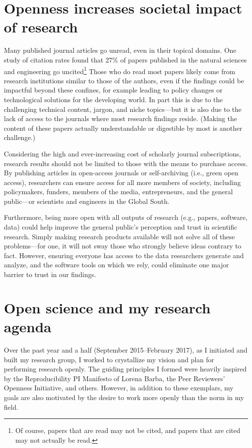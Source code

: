 \documentclass[nobib]{tufte-handout}
\begin{document}
\section{Openness increases societal impact of research}
\label{sec:impact}

Many published journal articles go unread, even in their topical domains.
One study of citation rates found that 27\% of papers published in the natural
sciences and engineering go uncited\autocite{Lariviere:2009}\footnote{Of course,
papers that are read may not be cited, and papers that are cited may not actually
be read.}
Those who do read most papers likely come from research institutions similar to
those of the authors, even if the findings could be impactful beyond these
confines, for example leading to policy changes or technological solutions
for the developing world. In part this is due to the challenging technical content,
jargon, and niche topics---but it is also due to the lack of access to the journals
where most research findings reside. (Making the content of these papers actually
understandable or digestible by most is another challenge.)

Considering the high and ever-increasing cost of scholarly journal subscriptions,
research results should not be limited to those with the means to purchase access.
By publishing articles in open-access journals or self-archiving (i.e., green open
access), researchers can ensure access for all more members of society, including
policymakers, funders, members of the media, entrepreneurs, and the general
public---or scientists and engineers in the Global South.

Furthermore, being more open with all outputs of research (e.g., papers, software,
data) could help improve the general public's perception and trust in
scientific research. Simply making research products available will not solve
all of these problems---for one, it will not sway those who strongly believe
ideas contrary to fact. However, ensuring everyone has access to the data researchers
generate and analyze, and the software tools on which we rely, could eliminate one
major barrier to trust in our findings\autocite{Grand:2012}.

\section{Open science and my research agenda}
\label{sec:agenda}

Over the past year and a half (September 2015--February 2017), as I initiated
and built my research group, I worked to crystallize my vision and plan for
performing research openly. The guiding principles I formed were heavily
inspired by the Reproducibility PI Manifesto of Lorena Barba\autocite{Barba:2012pi},
the Peer Reviewers' Openness Initiative\autocite{Morey150547}, and others.
However, in addition to these exemplars, my goals are also motivated by the desire
to work more openly than the norm in my field.
\end{document}
